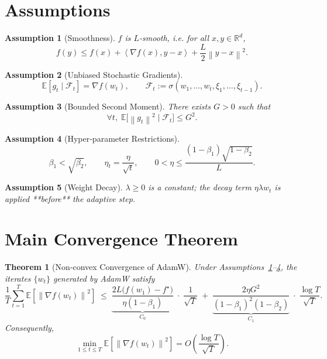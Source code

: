\documentclass{article}
\newtheorem{theorem}{Theorem}
\newtheorem{assumption}{Assumption}
\newcommand{\E}{\mathbb{E}}
\newcommand{\R}{\mathbb{R}}
\newcommand{\norm}[1]{\left\|#1\right\|}
\newcommand{\ip}[2]{\left\langle #1,#2\right\rangle}
\begin{document}
\newpage
\section*{Assumptions}
\begin{assumption}[Smoothness]\label{ass:smooth}
$f$ is $L$‑smooth, i.e. for all $x,y\in\R^{d}$,
\[
f(y)\le f(x)+\ip{\nabla f(x)}{y-x}+\frac{L}{2}\norm{y-x}^{2}.
\]
\end{assumption}
\begin{assumption}[Unbiased Stochastic Gradients]\label{ass:unbiased}
\[
\E[g_{t}\mid \mathcal{F}_{t}]=\nabla f(w_{t}),\qquad
\mathcal{F}_{t}:=\sigma(w_{1},\dots,w_{t},\xi_{1},\dots,\xi_{t-1}).
\]
\end{assumption}
\begin{assumption}[Bounded Second Moment]\label{ass:bounded}
There exists $G>0$ such that
\[
\forall t,\;\E\big[\norm{g_{t}}^{2}\mid\mathcal{F}_{t}\big]\le G^{2}.
\]
\end{assumption}
\begin{assumption}[Hyper‑parameter Restrictions]\label{ass:hyper}
\[
\beta_{1}<\sqrt{\beta_{2}},\qquad
\eta_{t}=\frac{\eta}{\sqrt{t}},\qquad
0<\eta\le \frac{(1-\beta_{1})\sqrt{1-\beta_{2}}}{L}.
\]
\end{assumption}
\begin{assumption}[Weight Decay]\label{ass:wd}
$\lambda\ge0$ is a constant; the decay term $\eta\lambda w_{t}$ is applied **before** the adaptive step.
\end{assumption}

\section*{Main Convergence Theorem}
\begin{theorem}[Non‑convex Convergence of AdamW]\label{thm:main}
Under Assumptions~\ref{ass:smooth}–\ref{ass:hyper}, the iterates $\{w_{t}\}$ generated by AdamW satisfy
\[
\frac{1}{T}\sum_{t=1}^{T}\E\!\left[\norm{\nabla f(w_{t})}^{2}\right]
\;\le\;
\underbrace{\frac{2L\big(f(w_{1})-f^{\star}\big)}{\eta(1-\beta_{1})}}_{\displaystyle C_{0}}
\;\cdot\;
\frac{1}{\sqrt{T}}
\;+\;
\underbrace{\frac{2\eta G^{2}}{(1-\beta_{1})^{2}(1-\beta_{2})}}_{\displaystyle C_{1}}
\;\cdot\;
\frac{\log T}{\sqrt{T}} .
\]
Consequently,
\[
\min_{1\le t\le T}\E\!\left[\norm{\nabla f(w_{t})}^{2}\right]
= O\!\left(\frac{\log T}{\sqrt{T}}\right).
\]
\end{theorem}
\end{document}
